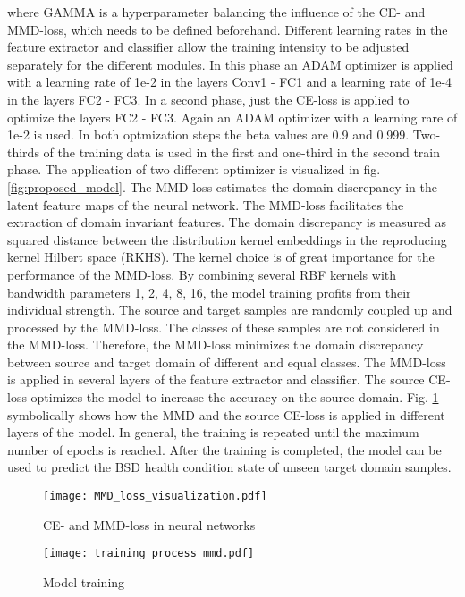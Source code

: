 where GAMMA is a hyperparameter balancing the influence of the CE- and MMD-loss, which needs to be defined beforehand. Different learning rates in the feature extractor and classifier allow the training intensity to be adjusted separately for the different modules. In this phase an ADAM optimizer is applied with a learning rate of 1e-2 in the layers Conv1 - FC1 and a learning rate of 1e-4 in the layers FC2 - FC3. In a second phase, just the CE-loss is applied to optimize the layers FC2 - FC3. Again an ADAM optimizer with a learning rare of 1e-2 is used. In both optmization steps the beta values are 0.9 and 0.999. Two-thirds of the training data is used in the first and one-third in the second train phase. The application of two different optimizer is visualized in fig. \ref{fig:proposed_model}. The MMD-loss estimates the domain discrepancy in the latent feature maps of the neural network. The MMD-loss facilitates the extraction of domain invariant features. The domain discrepancy is measured as squared distance between the distribution kernel embeddings in the reproducing kernel Hilbert space (RKHS). The kernel choice is of great importance for the performance of the MMD-loss. By combining several RBF kernels with bandwidth parameters 1, 2, 4, 8, 16, the model training profits from their individual strength. The source and target samples are randomly coupled up and processed by the MMD-loss. The classes of these samples are not considered in the MMD-loss. Therefore, the MMD-loss minimizes the domain discrepancy between source and target domain of different and equal classes. The MMD-loss is applied in several layers of the feature extractor and classifier. The source CE-loss optimizes the model to increase the accuracy on the source domain. Fig. \ref{fig:MMD_Loss_and_CE_loss} symbolically shows how the MMD and the source CE-loss is applied in different layers of the model. In general, the training is repeated until the maximum number of epochs is reached. After the training is completed, the model can be used to predict the BSD health condition state of unseen target domain samples. 



\begin{figure}[H]
  \centering
  \texttt{[image: MMD\_loss\_visualization.pdf]}
  \caption {CE- and MMD-loss in neural networks} \label{fig:MMD_Loss_and_CE_loss}
\end{figure}

\begin{figure}[H]
  \centering
  \texttt{[image: training\_process\_mmd.pdf]}
  \caption {Model training} \label{fig:Training_Process_MMD}
\end{figure}

